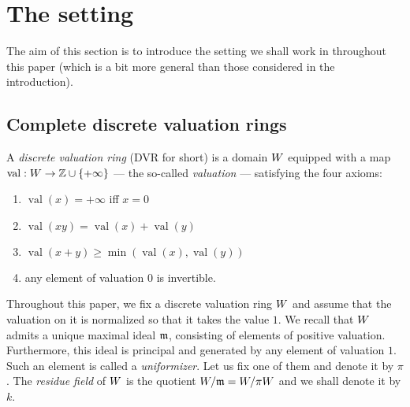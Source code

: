 \documentclass{article}
\DeclareMathOperator{\val}{val}
\begin{document}
\section{The setting}
\label{subsec:setting}

The aim of this section is to introduce the setting we shall work in 
throughout this paper (which is a bit more general than those considered 
in the introduction).

\subsection{Complete discrete valuation rings}

\begin{deftn}
A \emph{discrete valuation ring} (DVR for short) is a domain $W$
equipped with a map $\val : \A \to \Z \cup \{+\infty\}$ --- the 
so-called \emph{valuation} --- satisfying the four axioms: 
\begin{enumerate}
\item $\val(x) = +\infty$ iff $x = 0$
\item $\val(xy) = \val(x) + \val(y)$
\item $\val(x+y) \geq \min(\val(x), \val(y))$
\item any element of valuation $0$ is invertible.
\end{enumerate}
\end{deftn}

Throughout this paper, we fix a discrete valuation ring $W$ and assume 
that the valuation on it is normalized so that it takes the value $1$. 
We recall that $W$ admits a unique maximal ideal $\mathfrak m$, consisting of 
elements of positive valuation. Furthermore, this ideal is principal and 
generated by any element of valuation $1$. Such an element is called a 
\emph{uniformizer}. Let us fix one of them and denote it by $\pi$. The 
\emph{residue field} of $W$ is the quotient $W/\mathfrak m = W/\pi W$ and we 
shall denote it by $k$.
\end{document}

